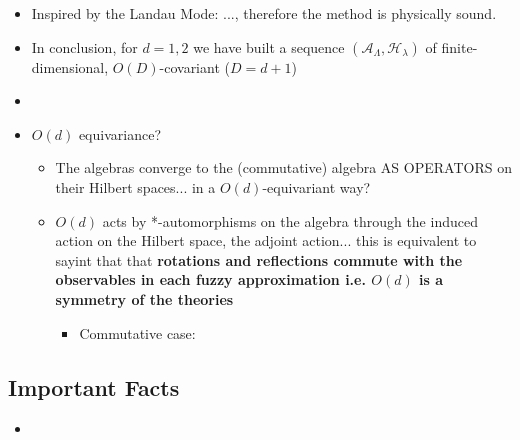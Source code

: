 \documentclass{article}
\begin{document}
    \begin{itemize}

    \item Inspired by the Landau Mode: ..., therefore the method is physically sound.
    
    \item In conclusion, for $d = 1, 2$ we have built a sequence $(\mathcal A_\Lambda, \mathcal H_\lambda)$ of finite-dimensional, $O(D)$-covariant ($D = d + 1$) 
    
    \item {}
    
    \item $O(d)$ equivariance?
    
        \begin{itemize}
            
        \item The algebras converge to the (commutative) algebra AS OPERATORS on their Hilbert spaces... in a $O(d)$-equivariant way?
        
        \item $O(d)$ acts by *-automorphisms on the algebra through the induced action on the Hilbert space, the adjoint action... this is equivalent to sayint that that \textbf{rotations and reflections commute with the observables in each fuzzy approximation i.e. $O(d)$ is a symmetry of the theories} 
        
            \begin{itemize}
                
            \item Commutative case: 
                
            \end{itemize}
            
        \end{itemize}
    
    \end{itemize}

\subsection{Important Facts}

    \begin{itemize}

    \item 
    
    \end{itemize}
\end{document}
